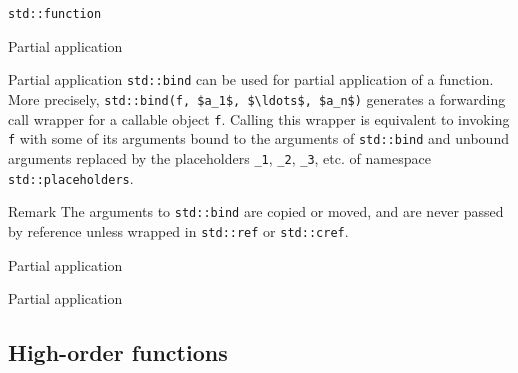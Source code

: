 \begin{frame}{\texttt{std::function}}{}
  \begin{example}
  \end{example}
\end{frame}

\begin{frame}{Partial application}{}
  \begin{block}{Partial application}
    \lstinline!std::bind! can be used for partial application of a function. More precisely, \lstinline[mathescape]!std::bind(f, $a_1$, $\ldots$, $a_n$)! generates a forwarding call wrapper for a callable object \lstinline!f!. Calling this wrapper is equivalent to invoking \lstinline!f! with some of its arguments bound to the arguments of \lstinline!std::bind! and unbound arguments replaced by the placeholders \lstinline!_1!, \lstinline!_2!, \lstinline!_3!, etc. of namespace \lstinline!std::placeholders!.
  \end{block}

  \begin{block}{Remark}
    The arguments to \lstinline!std::bind! are copied or moved, and are never passed by reference unless wrapped in \lstinline!std::ref! or \lstinline!std::cref!.
  \end{block}
\end{frame}

\begin{frame}{Partial application}{}
  \begin{example}
  \end{example}
\end{frame}

\begin{frame}{Partial application}{}
  \begin{example}
  \end{example}
\end{frame}



\subsection{High-order functions}


